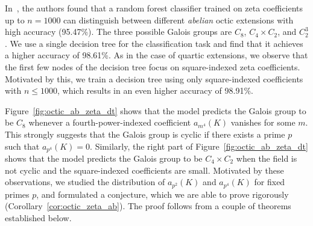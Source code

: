 \documentclass[letterpaper, 10pt]{article}
\newcommand{\1}{\mathds{1}}	%
\theoremstyle{definition}
\theoremstyle{remark}
\begin{document}
In~\cite[Section~5.2]{he2022machine}, the authors found that a random forest classifier trained on zeta coefficients up to \( n = 1000 \) can distinguish between different \emph{abelian} octic extensions with high accuracy (95.47\%). The three possible Galois groups are \( C_8 \), \( C_4 \times C_2 \), and \( C_2^3 \).
 We use a single decision tree for the classification task and find that it achieves a higher accuracy of  98.61\%. As in the case of quartic extensions, we observe that the first few nodes of the decision tree focus on square-indexed zeta coefficients. Motivated by this, we train a decision tree using only square-indexed coefficients with \( n \le 1000 \), which results in an even higher accuracy of 98.91\%.

Figure~\ref{fig:octic_ab_zeta_dt} shows that the model predicts the Galois group to be \( C_8 \) whenever a fourth-power-indexed coefficient \( a_{m^4}(K) \) vanishes for some  \( m \). This strongly suggests that the Galois group is cyclic if there exists a prime \( p \) such that \( a_{p^4}(K) = 0 \). Similarly, the right part of Figure~\ref{fig:octic_ab_zeta_dt} shows that the model predicts the Galois group to be \( C_4 \times C_2 \) when the field is not cyclic and the square-indexed coefficients are small. Motivated by these observations, we studied the distribution of \( a_{p^2}(K) \) and \( a_{p^4}(K) \) for fixed primes \( p \), and formulated a conjecture, which we are able to prove rigorously (Corollary~\ref{cor:octic_zeta_ab}). The proof follows from a couple of theorems established below.
\end{document}
